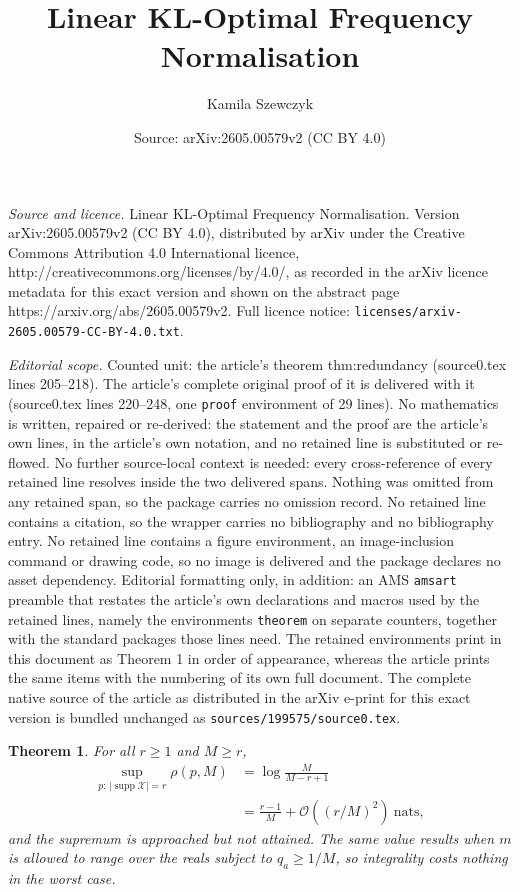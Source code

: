 \documentclass[10pt,a4paper]{amsart}
\title{Linear KL-Optimal Frequency Normalisation}
\author{Kamila Szewczyk}
\date{Source: arXiv:2605.00579v2 (CC BY 4.0)}
\newtheorem{theorem}{Theorem}
\DeclareMathOperator{\supp}{supp}
\begin{document}
\maketitle

\noindent\emph{Source and licence.} Linear KL-Optimal Frequency Normalisation. Version arXiv:2605.00579v2 (CC BY 4.0), distributed by arXiv under the Creative Commons Attribution 4.0 International licence, http://creativecommons.org/licenses/by/4.0/, as recorded in the arXiv licence metadata for this exact version and shown on the abstract page https://arxiv.org/abs/2605.00579v2. Full licence notice: \texttt{licenses/arxiv-2605.00579-CC-BY-4.0.txt}.\par\smallskip

\noindent\textit{Editorial scope.} Counted unit: the article's theorem thm:redundancy (source0.tex lines 205--218). The article's complete original proof of it is delivered with it (source0.tex lines 220--248, one \texttt{proof} environment of 29 lines). No mathematics is written, repaired or re-derived: the statement and the proof are the article's own lines, in the article's own notation, and no retained line is substituted or re-flowed.  No further source-local context is needed: every cross-reference of every retained line resolves inside the two delivered spans.  Nothing was omitted from any retained span, so the package carries no omission record.  No retained line contains a citation, so the wrapper carries no bibliography and no bibliography entry.  No retained line contains a figure environment, an image-inclusion command or drawing code, so no image is delivered and the package declares no asset dependency.  Editorial formatting only, in addition: an AMS \texttt{amsart} preamble that restates the article's own declarations and macros used by the retained lines, namely the environments \texttt{theorem} on separate counters, together with the standard packages those lines need.  The retained environments print in this document as Theorem 1 in order of appearance, whereas the article prints the same items with the numbering of its own full document.  The complete native source of the article as distributed in the arXiv e-print for this exact version is bundled unchanged as \texttt{sources/199575/source0.tex}.
\begin{theorem}
\label{thm:redundancy}
For all $r\ge1$ and $M\ge r$,
\begin{equation}
\begin{aligned}
   \sup_{p:\,|\supp \mathcal X|=r}\rho(p,M)
   &=\log\frac{M}{M-r+1} \\
   &=\frac{r-1}{M}+\mathcal{O}\!\left((r/M)^2\right)\ \text{nats},
\end{aligned}
\end{equation}
and the supremum is approached but not attained. The same value results when $m$
is allowed to range over the reals subject to $q_a\ge1/M$, so integrality costs
nothing in the worst case.
\end{theorem}
\end{document}
